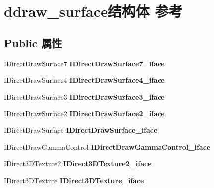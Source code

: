 \hypertarget{structddraw__surface}{}\section{ddraw\+\_\+surface结构体 参考}
\label{structddraw__surface}
\subsection*{Public 属性}
\begin{DoxyCompactItemize}
\item 
\mbox{\label{structddraw__surface_acc7a05809d56ca331fc0761a832dfea5}} 
I\+Direct\+Draw\+Surface7 {\bfseries I\+Direct\+Draw\+Surface7\+\_\+iface}
\item 
\mbox{\label{structddraw__surface_aef09fcc4ff6c75491e719ec2a9c15b43}} 
I\+Direct\+Draw\+Surface4 {\bfseries I\+Direct\+Draw\+Surface4\+\_\+iface}
\item 
\mbox{\label{structddraw__surface_a891e8ea09db0965d96848e81e142ced5}} 
I\+Direct\+Draw\+Surface3 {\bfseries I\+Direct\+Draw\+Surface3\+\_\+iface}
\item 
\mbox{\label{structddraw__surface_a3482ee89f5d24dfcc684be67f3b14e6c}} 
I\+Direct\+Draw\+Surface2 {\bfseries I\+Direct\+Draw\+Surface2\+\_\+iface}
\item 
\mbox{\label{structddraw__surface_a0d59427f4c1b952066fbe9411af5a210}} 
I\+Direct\+Draw\+Surface {\bfseries I\+Direct\+Draw\+Surface\+\_\+iface}
\item 
\mbox{\label{structddraw__surface_a423a52cebd0275eb18c5129b5378d413}} 
I\+Direct\+Draw\+Gamma\+Control {\bfseries I\+Direct\+Draw\+Gamma\+Control\+\_\+iface}
\item 
\mbox{\label{structddraw__surface_af88dfbd817eb869ae7bfe0c4b60bef0f}} 
I\+Direct3\+D\+Texture2 {\bfseries I\+Direct3\+D\+Texture2\+\_\+iface}
\item 
\mbox{\label{structddraw__surface_abef58e829caf7dd86e8e0e9dabaf5b1b}} 
I\+Direct3\+D\+Texture {\bfseries I\+Direct3\+D\+Texture\+\_\+iface}

\end{DoxyCompactItemize}
